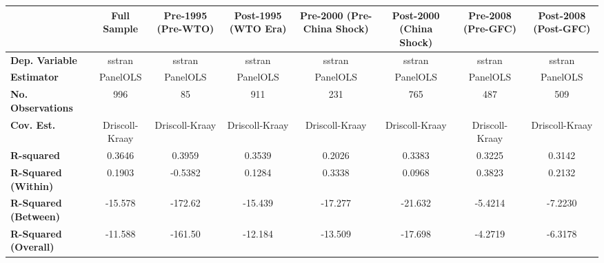 \begin{center}
\begin{tabular}{lccccccc}
\toprule
                                   & \textbf{Full Sample} & \textbf{Pre-1995 (Pre-WTO)} & \textbf{Post-1995 (WTO Era)} & \textbf{Pre-2000 (Pre-China Shock)} & \textbf{Post-2000 (China Shock)} & \textbf{Pre-2008 (Pre-GFC)} & \textbf{Post-2008 (Post-GFC)}  \\
\midrule
\textbf{Dep. Variable}             &        sstran        &            sstran           &            sstran            &                sstran               &              sstran              &            sstran           &             sstran             \\
\textbf{Estimator}                 &       PanelOLS       &           PanelOLS          &           PanelOLS           &               PanelOLS              &             PanelOLS             &           PanelOLS          &            PanelOLS            \\
\textbf{No. Observations}          &         996          &              85             &             911              &                 231                 &               765                &             487             &              509               \\
\textbf{Cov. Est.}                 &    Driscoll-Kraay    &        Driscoll-Kraay       &        Driscoll-Kraay        &            Driscoll-Kraay           &          Driscoll-Kraay          &        Driscoll-Kraay       &         Driscoll-Kraay         \\
\textbf{R-squared}                 &        0.3646        &            0.3959           &            0.3539            &                0.2026               &              0.3383              &            0.3225           &             0.3142             \\
\textbf{R-Squared (Within)}        &        0.1903        &           -0.5382           &            0.1284            &                0.3338               &              0.0968              &            0.3823           &             0.2132             \\
\textbf{R-Squared (Between)}       &       -15.578        &           -172.62           &           -15.439            &               -17.277               &             -21.632              &           -5.4214           &            -7.2230             \\
\textbf{R-Squared (Overall)}       &       -11.588        &           -161.50           &           -12.184            &               -13.509               &             -17.698              &           -4.2719           &            -6.3178             \\

\end{tabular}
\end{center}
